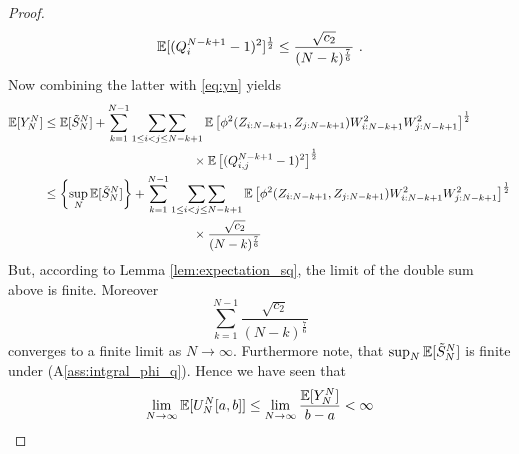 \begin{thm}
\begin{proof}
\begin{equation*}
		\mathbb{E}[(Q_i^{N-k+1} - 1)^2]^\frac{1}{2} \leq \frac{\sqrt{c_2}}{(N-k)^\frac{7}{6}}\textrm{ .}
		\end{equation*}
		Now combining the latter with \eqref{eq:yn} yields 
		\begin{align*}
		\mathbb{E}[Y_N^N] &\leq  \mathbb{E}[\tilde{S}_{N}^N] + \sum_{k=1}^{N-1} \mathop{\sum\sum}\limits_{1\leq i<j\leq N-k+1}\mathbb{E}\left[\phi^2(Z_{i:N-k+1}, Z_{j:N-k+1}) W^2_{i:N-k+1} W^2_{j:N-k+1}\right]^{\frac{1}{2}}\\
		&\qquad\qquad\qquad\qquad\qquad\qquad \times \mathbb{E}\left[(Q_{i,j}^{N-k+1} - 1)^2\right]^{\frac{1}{2}}\\
		&\leq \left\{\sup_{N}\mathbb{E}[\tilde{S}_{N}^N]\right\} + \sum_{k=1}^{N-1} \mathop{\sum\sum}\limits_{1\leq i<j\leq N-k+1}\mathbb{E}\left[\phi^2(Z_{i:N-k+1}, Z_{j:N-k+1}) W^2_{i:N-k+1} W^2_{j:N-k+1}\right]^{\frac{1}{2}}\\
		&\qquad\qquad\qquad\qquad\qquad\qquad \times \frac{\sqrt{c_2}}{(N-k)^\frac{7}{6}}
		\end{align*}
		But, according to Lemma \ref{lem:expectation_sq}, the limit of the double sum above is finite. Moreover 
		$$ \sum_{k=1}^{N-1}\frac{\sqrt{c_2}}{(N-k)^\frac{7}{6}}$$
		converges to a finite limit as $N\to\infty$. Furthermore note, that $\sup_{N}\mathbb{E}[\tilde{S}_{N}^N]$ is finite under (A\ref{ass:intgral_phi_q}). Hence we have seen that
		$$\lim\limits_{N\to\infty}\mathbb{E}[U_{N}^N[a,b]]\leq \lim\limits_{N\to\infty}\frac{\mathbb{E}[Y_{N}^N]}{b-a} <\infty$$
	\end{proof}
\end{thm}

